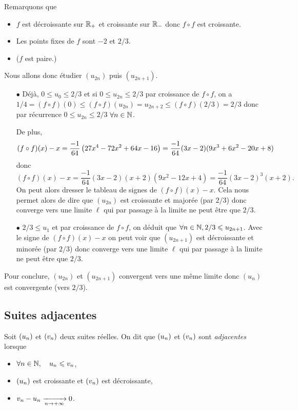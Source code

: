 \documentclass{magnolia}
\begin{document}
\begin{sol}
Remarquons que 
\begin{itemize}
\item $f$ est décroissante sur $\mathbb{R}_+$ et croissante sur $\mathbb{R}_-$ donc $f\circ f$ est croissante.
\item Les points fixes de $f$ sont $-2$ et $2/3$.
\item ($f$ est paire.)
\end{itemize}
Nous allons donc étudier $(u_{2n})$ puis $(u_{2n+1})$.
\begin{itemize}
\item[$\bullet$] Déjà, $0\leq u_0\leq 2/3$ et si $0\leq u_{2n} \leq 2/3$ par croissance de $f\circ f$, on a $1/4=(f\circ f)(0)\leq (f\circ f)(u_{2n})=u_{2n+2} \leq (f\circ f)(2/3)=2/3$ donc par récurrence $0\leq u_{2n} \leq 2/3$ $\forall n \in \mathbb{N}$. 

De plus, $$(f\circ f)(x)-x=\frac{-1}{64}\left(27x^4-72x^2+64x-16\right)=\frac{-1}{64}(3x-2)(9x^3+6x^2-20x+8)$$ donc $$(f\circ f)(x)-x=\frac{-1}{64}(3x-2)(x+2)(9x^2-12x+4)=\frac{-1}{64}(3x-2)^3(x+2).$$
On peut alors dresser le tableau de signes de $(f\circ f)(x)-x$. Cela nous permet alors de dire que $(u_{2n})$ est croissante et majorée (par $2/3$) donc converge vers une limite $\ell$ qui par passage à la limite ne peut être que $2/3$.

\item[$\bullet$] $2/3\leq u_1 $ et par croissance de $f\circ f$, on déduit que $\forall n \in \mathbb{N}, 2/3\leqslant u_{2n+1}$. Avec le signe de $(f\circ f)(x)-x$ on peut voir que $(u_{2n+1})$ est décroissante et minorée (par $2/3$) donc converge vers une limite $\ell$ qui par passage à la limite ne peut être que $2/3$.

\end{itemize}

Pour conclure, $(u_{2n})$ et $(u_{2n+1})$ convergent vers une même limite donc $(u_n)$ est convergente (vers $2/3$).
\end{sol}

\subsection{Suites adjacentes}

\begin{definition}[utile=-3]
Soit $\left(u_n\right)$ et $\left(v_n\right)$ deux suites réelles. On dit que $\left(u_n\right)$ et
$\left(v_n\right)$ sont \emph{adjacentes} lorsque
\begin{itemize}
\item $\forall n\in\mathbb{N} ,\quad u_n \leqslant v_n$,
\item $\left(u_n\right)$ est croissante et $\left(v_n\right)$ est décroissante,
\item $v_n-u_n \xrightarrow[n\rightarrow +\infty]{} 0$.
\end{itemize}
\end{definition}
\end{document}
